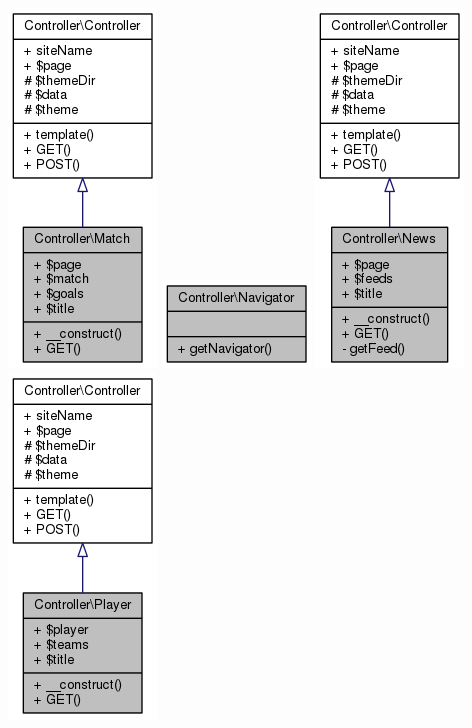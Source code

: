 \documentclass[11pt]{article}
\begin{document}
\includegraphics[scale=0.4]{UML_Controller_1_1Match.png}
\includegraphics[scale=0.4]{UML_Controller_1_1Navigator.png}
\includegraphics[scale=0.4]{UML_Controller_1_1News.png}
\includegraphics[scale=0.4]{UML_Controller_1_1Player.png}
\end{document}
